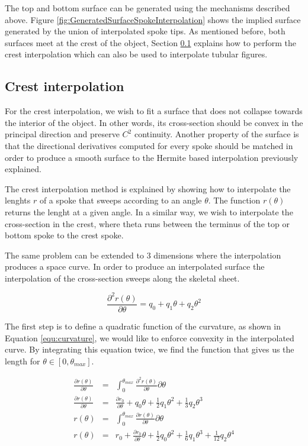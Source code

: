 The top and bottom surface can be generated using the mechanisms described above. 
Figure \ref{fig:GeneratedSurfaceSpokeInterpolation} shows the implied surface generated by the union of 
interpolated spoke tips.
As mentioned before, both surfaces meet at the crest of the object, 
Section \ref{sec:crestInterpolation} explains how to perform the crest interpolation which 
can also be used to interpolate tubular figures.

\subsection{Crest interpolation}
\label{sec:crestInterpolation}

For the crest interpolation, we wish to fit a surface that 
does not collapse towards the interior of the object. In other words, 
its cross-section should be convex
in the principal direction and preserve $C^2$ continuity. Another property of the surface is that the directional 
derivatives computed for every spoke should be matched in order to produce a smooth surface
to the Hermite based interpolation previously explained.

The crest interpolation method is explained by showing how to interpolate the lenghts $r$ of a spoke
that sweeps according to an angle $\theta$.
The function $r(\theta)$ returns the lenght at a given angle.
In a similar way, we wish to interpolate the cross-section in the crest, where theta 
runs between the terminus of the top or bottom spoke to the crest spoke. 

The same problem can be extended to 3 dimensions where the interpolation produces a space curve.
In order to produce an interpolated surface the interpolation of the cross-section 
sweeps along the skeletal sheet.

\begin{equation} 
 \frac{\partial^2 r(\theta)}{\partial \theta} = q_0  +  q_1  \theta + q_2  \theta^2  
 \label{equ:curvature}
\end{equation}

The first step is to define a quadratic function of the curvature, as shown in Equation
\ref{equ:curvature}, we would like to enforce convexity in the interpolated curve.
By integrating this equation twice, we find the function that gives us the length for $\theta \in [0, \theta_{max}]$.

\begin{eqnarray} 
  \frac{\partial r(\theta)}{\partial \theta} &=& \int_0^{\theta_{max}} \frac{\partial^2 r(\theta)}{\partial \theta} \partial \theta \\
  \frac{\partial r(\theta)}{\partial \theta} &=& \frac{\partial r_0}{\partial \theta} + q_0  \theta + \frac{1}{2}  q_1  \theta^2 + \frac{1}{3}  q_2  \theta^3  \\
  r(\theta) &=& \int_0^{\theta_{max}} \frac{\partial r(\theta)}{\partial \theta} \partial \theta \\
  r(\theta) &=& r_0 + \frac{\partial r_0}{\partial \theta}  \theta + \frac{1}{2}  q_0  \theta^2 + \frac{1}{6}  q_1  \theta^3 + \frac{1}{12}  q_2  \theta^4  
\end{eqnarray}

